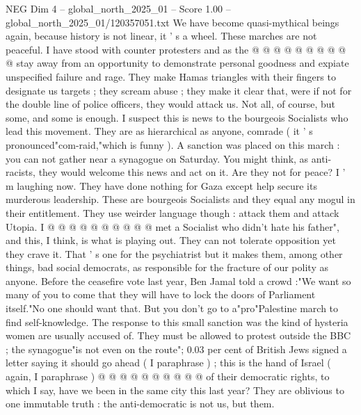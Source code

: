 \begin{textsample}{NEG Dim 4 – global\_north\_2025\_01 – Score 1.00 – global\_north\_2025\_01/120357051.txt}
We have become quasi-mythical beings again, because history is not linear, it ' s a wheel.
These marches are not peaceful.
I have stood with counter protesters and as the @ @ @ @ @ @ @ @ @ @ stay away from an opportunity to demonstrate personal goodness and expiate unspecified failure and rage.
They make Hamas triangles with their fingers to designate us targets ; they scream abuse ; they make it clear that, were if not for the double line of police officers, they would attack us.
Not all, of course, but some, and some is enough.
I suspect this is news to the bourgeois Socialists who lead this movement.
They are as hierarchical as anyone, comrade ( it ' s pronounced"com-raid,"which is funny ).
A sanction was placed on this march : you can not gather near a synagogue on Saturday.
You might think, as anti-racists, they would welcome this news and act on it.
Are they not for peace?
I ' m laughing now.
They have done nothing for Gaza except help secure its murderous leadership.
These are bourgeois Socialists and they equal any mogul in their entitlement.
They use weirder language though : attack them and attack Utopia.
I @ @ @ @ @ @ @ @ @ @ met a Socialist who didn't hate his father", and this, I think, is what is playing out.
They can not tolerate opposition yet they crave it.
That ' s one for the psychiatrist but it makes them, among other things, bad social democrats, as responsible for the fracture of our polity as anyone.
Before the ceasefire vote last year, Ben Jamal told a crowd :"We want so many of you to come that they will have to lock the doors of Parliament itself."No one should want that.
But you don't go to a"pro"Palestine march to find self-knowledge.
The response to this small sanction was the kind of hysteria women are usually accused of.
They must be allowed to protest outside the BBC ; the synagogue"is not even on the route"; 0.03 per cent of British Jews signed a letter saying it should go ahead ( I paraphrase ) ; this is the hand of Israel ( again, I paraphrase ) @ @ @ @ @ @ @ @ @ @ of their democratic rights, to which I say, have we been in the same city this last year?
They are oblivious to one immutable truth : the anti-democratic is not us, but them.

\end{textsample}
